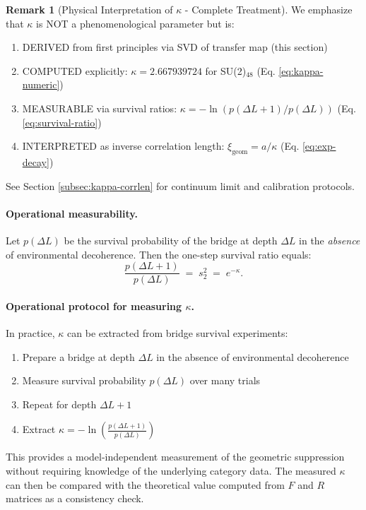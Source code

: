 \documentclass[11pt]{article}
\theoremstyle{plain}
\theoremstyle{definition}
\newtheorem{remark}[theorem]{Remark}
\begin{document}
\begin{remark}[Physical Interpretation of $\kappa$ - Complete Treatment]
  We emphasize that $\kappa$ is NOT a phenomenological parameter but is:
  \begin{enumerate}
    \item DERIVED from first principles via SVD of transfer map (this section)
    \item COMPUTED explicitly: $\kappa = 2.667939724$ for SU(2)$_{48}$ (Eq. \ref{eq:kappa-numeric})
    \item MEASURABLE via survival ratios: $\kappa = -\ln(p(\Delta L+1)/p(\Delta L))$ (Eq. \ref{eq:survival-ratio})
    \item INTERPRETED as inverse correlation length: $\xi_{\text{geom}} = a/\kappa$ (Eq. \ref{eq:exp-decay})
  \end{enumerate}
  See Section \ref{subsec:kappa-corrlen} for continuum limit and calibration protocols.
\end{remark}

\paragraph{Operational measurability.}
Let $p(\Delta L)$ be the survival probability of the bridge at depth $\Delta L$ in the \emph{absence} of environmental decoherence. Then the one-step survival ratio equals:
\begin{equation}
  \frac{p(\Delta L+1)}{p(\Delta L)} \;=\; s_2^2 \;=\; e^{-\kappa}.
  \label{eq:survival-ratio}
\end{equation}

\paragraph{Operational protocol for measuring $\kappa$.}
In practice, $\kappa$ can be extracted from bridge survival experiments:
\begin{enumerate}
  \item Prepare a bridge at depth $\Delta L$ in the absence of environmental decoherence
  \item Measure survival probability $p(\Delta L)$ over many trials
  \item Repeat for depth $\Delta L + 1$
  \item Extract $\kappa = -\ln\left(\frac{p(\Delta L+1)}{p(\Delta L)}\right)$
\end{enumerate}
This provides a model-independent measurement of the geometric suppression without requiring knowledge of the underlying category data. The measured $\kappa$ can then be compared with the theoretical value computed from $F$ and $R$ matrices as a consistency check.
\end{document}
